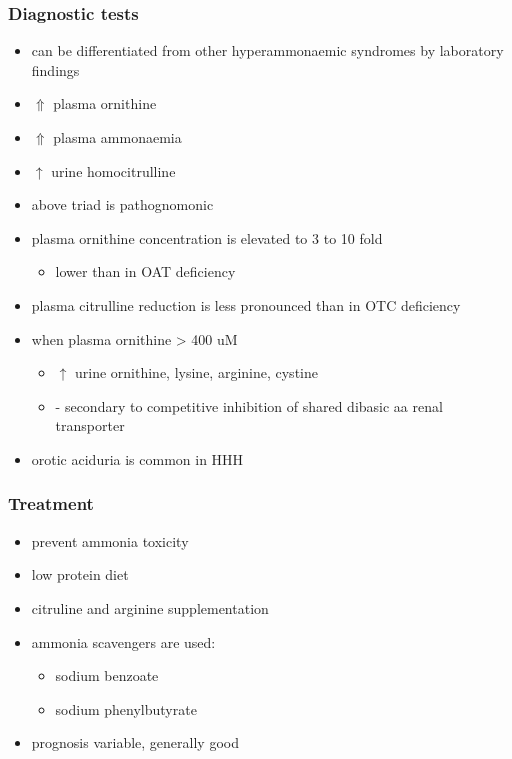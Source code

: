 \documentclass{scrartcl}
\begin{document}
\subsubsection{Diagnostic tests}
\label{sec:org67d68e9}
\begin{itemize}
\item can be differentiated from other hyperammonaemic syndromes by laboratory findings
\item \(\Uparrow\) plasma ornithine
\item \(\Uparrow\) plasma ammonaemia
\item \(\uparrow\) urine homocitrulline
\item above triad is pathognomonic
\item plasma ornithine concentration is elevated to 3 to 10 fold
\begin{itemize}
\item lower than in OAT deficiency
\end{itemize}
\item plasma citrulline reduction is less pronounced than in OTC
deficiency
\item when plasma ornithine \textgreater{} 400 uM
\begin{itemize}
\item \(\uparrow\) urine ornithine, lysine, arginine, cystine
\item - secondary to competitive inhibition of shared dibasic aa renal transporter
\end{itemize}
\item orotic aciduria is common in HHH
\end{itemize}

\subsubsection{Treatment}
\label{sec:orgd808c1d}
\begin{itemize}
\item prevent ammonia toxicity
\item low protein diet
\item citruline and arginine supplementation
\item ammonia scavengers are used:
\begin{itemize}
\item sodium benzoate
\item sodium phenylbutyrate
\end{itemize}
\item prognosis variable, generally good
\end{itemize}
\end{document}
